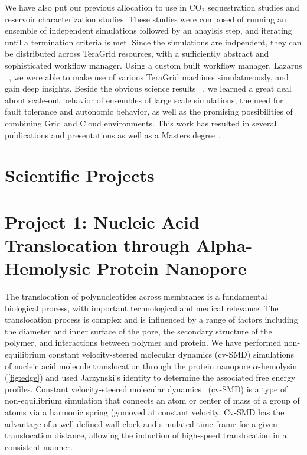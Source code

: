 \documentclass[a4paper,10pt]{article}
\begin{document}

We have also put our previous allocation to use in CO$_2$ sequestration studies
and reservoir characterization studies. These studies were composed of running an ensemble
of independent simulations followed by an anaylsis step, and iterating until a termination criteria is met.
Since the simulations are indpendent, they can be distributed across TeraGrid resources, with
a sufficiently abstract and sophisticated workflow manager. Using a custom built workflow manager,
Lazarus ~\cite{gmac}, we were able to make use of various TeraGrid machines simulatneously, and
gain deep insights. Beside the obvious science results ~\cite{teragrid10}, we learned a great
deal about scale-out behavior of ensembles of large scale simulations, the need for fault
tolerance and autonomic behavior, as well as the promising possibilities of combining
Grid and Cloud environments. This work has resulted in several publications  and presentations
as well as a Masters degree .


\section{Scientific Projects}



\section*{Project 1: Nucleic Acid Translocation through Alpha-Hemolysic Protein Nanopore}

The translocation of polynucleotides across membranes is a fundamental biological process, with important technological and medical relevance.  The translocation process is complex and is influenced by a range of factors including the diameter and inner surface of the pore, the secondary structure of the polymer, and interactions between polymer and protein. We have performed non-equilibrium constant velocity-steered molecular dynamics (cv-SMD) simulations of nucleic acid molecule translocation through the protein nanopore $\alpha$-hemolysin (\ref{fig:edge}) and used Jarzynski's identity%
to determine the associated free energy profiles. Constant velocity-steered molecular dynamics~\cite{namd} (cv-SMD) is a type of non-equilibrium simulation that connects an atom or center of mass of a group of atoms via a harmonic spring (gomoved at constant velocity. Cv-SMD has the advantage of a well defined wall-clock and simulated time-frame for a given translocation distance, allowing the induction of high-speed translocation in a consistent manner.
\end{document}
